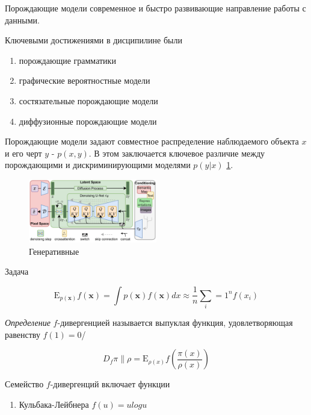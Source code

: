 
Порождающие модели современное и быстро развивающие направление работы с данными.

Ключевыми достижениями в дисципилине были \begin{enumerate}
    \item порождающие грамматики \cite{chomsky2002syntactic}
    \item графические вероятностные модели \cite{pearl1988probabilistic}
    \item состязательные порождающие модели \cite{goodfellow2020generative}
    \item диффузионные порождающие модели \cite{song2020score}
\end{enumerate}

Порождающие модели задают совместное распределение наблюдаемого объекта $x$ и его черт $y$ -  $p(x,y)$. В этом заключается 
ключевое различие между порождающими и дискриминирующими моделями $p(y|x)$ \ref{discr_vs_gen}.

\begin{figure}[h]
    \centering
    \includegraphics[width=0.5\textwidth]{assets/ml/generation/stable_diffusion.png}
    \caption{Генеративные }
    \label{discr_vs_gen}
\end{figure}

Задача 

\begin{equation}
    \mathrm E_{p(\mathbf{x})} f(\mathbf{x}) = \int p(\mathbf{x}) f(\mathbf{x}) dx \approx \frac{1}{n} \sum_i=1^n f(x_i)
\end{equation}



\textit{Определение} $f$-дивергенцией называется выпуклая функция, удовлетворяющая равенству $f(1)=0$/

$$
    D_f{\pi \parallel \rho} = \mathrm E_{\rho(x)} f\left(\frac{\pi(x)}{\rho(x)}\right)
$$

Семейство $f$-дивергенций включает функции \begin{enumerate}
    \item Кульбака-Лейбнера $f(u)=u logu $
\end{enumerate}








